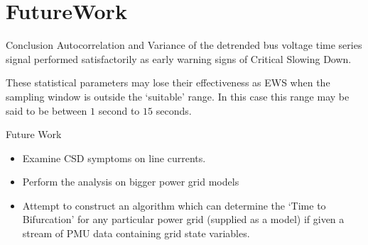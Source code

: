 \section[Conclusion and Future Work]{FutureWork}
\label{sec:future_work}

\begin{frame}{Conclusion}
	Autocorrelation and Variance of the detrended bus voltage time series signal performed satisfactorily as early warning signs of Critical Slowing Down.
	
	These statistical parameters may lose their effectiveness as EWS when the sampling window is outside the `suitable' range.
	In this case this range may be said to be between $1$ second to $15$ seconds. 
\end{frame}


\begin{frame}{Future Work}
	\begin{itemize}[<alert@+>]
		\item Examine CSD symptoms on line currents.
		\item Perform the analysis on bigger power grid models
		\item Attempt to construct an algorithm which can determine the `Time to Bifurcation' for any particular power grid (supplied as a model) if given a stream of PMU data containing grid state variables.
	\end{itemize}
\end{frame}